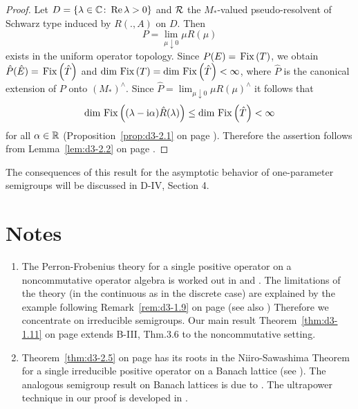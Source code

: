 \begin{proof}
Let $D = \{\lambda \in \mathbb{C} \colon \mathop{}\!\mathrm{Re}\,\lambda > 0\}$ and $\mathcal{R}$ the $M_{*}$-valued pseudo-resolvent of Schwarz type induced by $R(.,A)$ on $D$.
Then
\[
	P = \lim_{\mu \downarrow 0}\mu R(\mu)
\]
exists in the uniform operator topology.
Since $ P(E) = \mathop{}\mathrm{Fix}\left(T\right) $, we obtain $ \hat{P}(\hat{E}) = \mathop{}\mathrm{Fix}\left(\hat{T}\right) $ and 
$\dim \mathop{}\mathrm{Fix}\left(T\right) = \dim \mathop{}\mathrm{Fix}\left(\hat{T}\right) < \infty$, where $\hat{P}$ is the canonical extension of $P$ onto $(M_{*})^{\wedge}$.
Since $\hat{P} = \lim_{\mu \downarrow 0} \mu R(\mu)^{\wedge}$ it follows that
\[
\dim \mathop{}\mathrm{Fix}\left((\lambda - \mathrm{i}\alpha)\hat{R}(\lambda)\right) \leq \dim \mathop{}\mathrm{Fix}\left(\hat{T}\right) < \infty
\]
for all $\alpha \in \mathbb{R}$ (Proposition~\ref{prop:d3-2.1} on page \pageref{prop:d3-2.1}).
Therefore the assertion follows from Lemma~\ref{lem:d3-2.2} on page \pageref{lem:d3-2.2}.
\end{proof} 
The consequences of this result for the asymptotic behavior of one-parameter semigroups will be discussed in D-IV, Section 4.
\section*{Notes}\label{notes:d3-notes}

\begin{enumerate}[label=\emph{Section \arabic*:}, wide, itemsep=1ex]

\item
The Perron-Frobenius theory for a single positive operator on a noncommutative operator algebra is worked out in \citet{albeverio:1978} and \citet{groh:1981}.
The limitations of the theory (in the continuous as in the discrete case)
are explained by the example following Remark~\ref{rem:d3-1.9} on page \pageref{rem:d3-1.9} (see also \citet{groh:1982a}) 
Therefore we concentrate on irreducible semigroups.
Our main result Theorem~\ref{thm:d3-1.11} on page \pageref{thm:d3-1.11} extends B-III, Thm.3.6 to the noncommutative setting.

\item
Theorem~\ref{thm:d3-2.5} on page \pageref{thm:d3-2.5} has its roots in the Niiro-Sawashima Theorem for a single irreducible positive operator on a Banach lattice (see \citet[V.5.4]{schaefer:1974}).
The analogous semigroup result on Banach lattices is due to \citet{greiner:1982}.
The ultrapower technique in our proof is developed in \citet{groh:1984b}. 

\end{enumerate}


{\RaggedRight

}

































